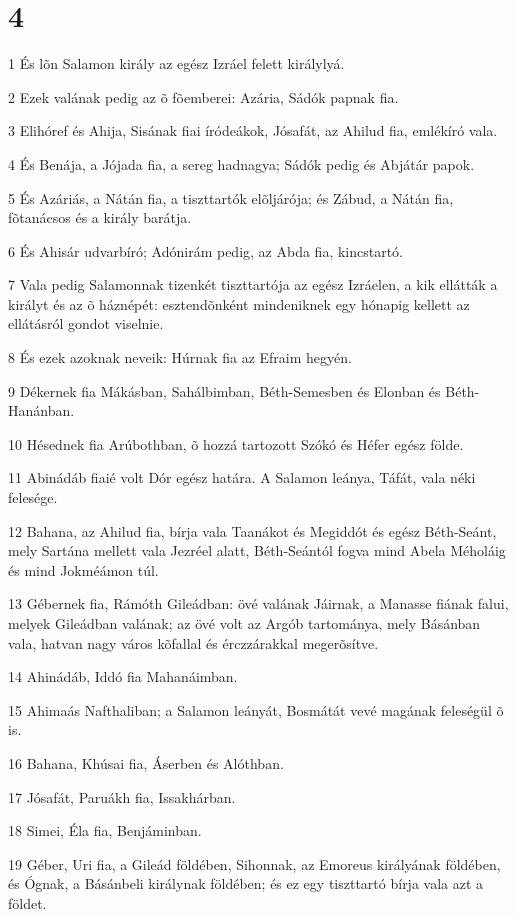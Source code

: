 \chapter{4}

\par 1 És lõn Salamon király az egész Izráel felett királylyá.
\par 2 Ezek valának pedig az õ fõemberei: Azária, Sádók papnak fia.
\par 3 Elihóref és Ahija, Sisának fiai íródeákok, Jósafát, az Ahilud fia, emlékíró vala.
\par 4 És Benája, a Jójada fia, a sereg hadnagya; Sádók pedig és Abjátár papok.
\par 5 És Azáriás, a Nátán fia, a tiszttartók elõljárója; és Zábud, a Nátán fia, fõtanácsos és a király barátja.
\par 6 És Ahisár udvarbíró; Adónirám pedig, az Abda fia, kincstartó.
\par 7 Vala pedig Salamonnak tizenkét tiszttartója az egész Izráelen, a kik ellátták a királyt és az õ háznépét: esztendõnként mindeniknek egy hónapig kellett az ellátásról gondot viselnie.
\par 8 És ezek azoknak neveik: Húrnak fia az Efraim hegyén.
\par 9 Dékernek fia Mákásban, Sahálbimban, Béth-Semesben és Elonban és Béth-Hanánban.
\par 10 Hésednek fia Arúbothban, õ hozzá tartozott Szókó és Héfer egész földe.
\par 11 Abinádáb fiaié volt Dór egész határa. A Salamon leánya, Táfát, vala néki felesége.
\par 12 Bahana, az Ahilud fia, bírja vala Taanákot és Megiddót és egész Béth-Seánt, mely Sartána mellett vala Jezréel alatt, Béth-Seántól fogva mind Abela Méholáig és mind Jokméámon túl.
\par 13 Gébernek fia, Rámóth Gileádban: övé valának Jáirnak, a Manasse fiának falui, melyek Gileádban valának; az övé volt az Argób  tartománya, mely Básánban vala, hatvan nagy város kõfallal és érczzárakkal megerõsítve.
\par 14 Ahinádáb, Iddó fia Mahanáimban.
\par 15 Ahimaás Nafthaliban; a Salamon leányát, Bosmátát vevé magának feleségül õ is.
\par 16 Bahana, Khúsai fia, Áserben és Alóthban.
\par 17 Jósafát, Paruákh fia, Issakhárban.
\par 18 Simei, Éla fia, Benjáminban.
\par 19 Géber, Uri fia, a Gileád földében, Sihonnak, az Emoreus királyának földében, és Ógnak, a Básánbeli királynak földében; és ez egy tiszttartó bírja vala azt a földet.
